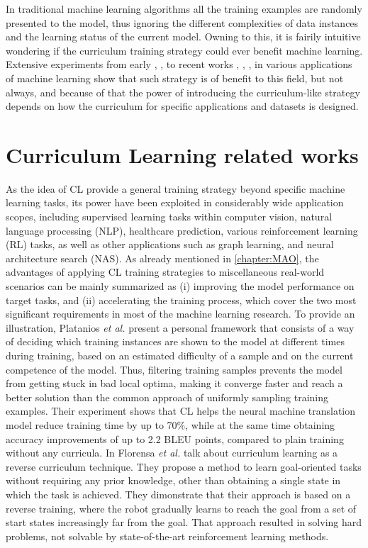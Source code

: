 In traditional machine learning algorithms all the training examples are randomly presented to the model,
thus ignoring the different complexities of data instances and the learning status of the current model. 
Owning to this, it is fairily intuitive wondering if the curriculum training strategy could ever benefit machine learning.
Extensive experiments from early \cite{bengio2009curriculum}, \cite{kumar2010self}, \cite{zaremba2014learning} to recent works \cite{fan2018learning}, \cite{graves2017automated}, \cite{hacohen2019power}, \cite{platanios2019competence} in various applications of machine learning show that such strategy is of benefit to this field, but not always, and 
because of that the power of introducing the curriculum-like strategy depends on how the curriculum for specific applications and datasets is designed.

\section{Curriculum Learning related works}
As the idea of CL provide a general training strategy beyond specific machine learning
tasks, its power have been exploited in considerably wide application scopes, including supervised learning
tasks within computer vision, natural language processing (NLP), healthcare prediction, various
reinforcement learning (RL) tasks, as well as other applications such
as graph learning, and neural architecture search (NAS). As already mentioned in \ref{chapter:MAO}, the advantages of applying CL
training strategies to miscellaneous real-world scenarios can be mainly summarized as (i) improving the model performance on 
target tasks, and (ii) accelerating the training process, which cover the two most significant 
requirements in most of the machine learning research. 
To provide an illustration,
Platanios \textit{et al.} \cite{platanios2019competence} present 
a personal framework that consists of a way of deciding which training instances
are shown to the model at different times during training, based on 
an estimated difficulty of a sample and on the current competence
of the model. Thus, filtering training samples prevents the model from 
getting stuck in bad local optima, making it converge faster and reach
a better solution than the common approach of uniformly 
sampling training examples. Their experiment shows that CL helps the 
neural machine translation model reduce training time by up to 70\%, while at the 
same time obtaining accuracy improvements of up to 2.2 BLEU points, compared
to plain training without any curricula. In \cite{florensa2017reverse} Florensa 
\textit{et al.} talk about curriculum learning as a reverse curriculum technique. 
They propose a method to learn goal-oriented tasks without requiring
any prior knowledge, other than obtaining a single state in which
the task is achieved. They dimonstrate that their approach is 
based on a reverse training, where the robot gradually learns to reach 
the goal from a set of start states increasingly far from the goal.
That approach resulted in solving hard problems, not solvable 
by state-of-the-art reinforcement learning methods.

